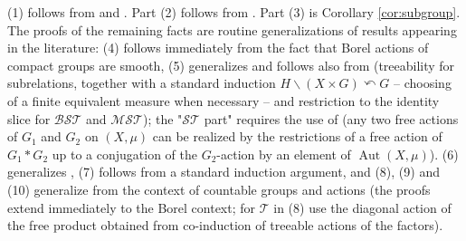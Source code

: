 \documentclass[11pt]{amsart}
\theoremstyle{definition}
\theoremstyle{plain}
\newcommand{\<}{\langle}
\renewcommand{\>}{\rangle}
\DeclareMathOperator{\Aut}{Aut}
\newcommand{\BSTreeable}{\bm{\mathscr{BST}}}
\newcommand{\MSTreeable}{\bm{\mathscr{MST}}}
\newcommand{\STreeable}{\bm{\mathscr{ST}}}
\newcommand{\Treeable}{\bm{\mathscr{T}}}
\newcommand{\pmp}{\text{p.m.p.}}
\begin{document}
\begin{appendices}
(1) follows from \cite{SS13} and \cite{JKL02}. Part (2) follows from \cite{CFW81}. Part (3) is Corollary \ref{cor:subgroup}. The proofs of the remaining facts are routine generalizations of results appearing in the literature: (4) follows immediately from the fact that Borel actions of compact groups are smooth, (5) generalizes \cite[Th. 5]
{Gab00a} and follows also from \cite[Proposition 3.3]{JKL02} (treeability for subrelations,
together with a standard induction $ H\backslash (X\times G)\curvearrowleft G$ -- choosing of a finite equivalent measure when necessary -- and restriction to the identity slice for $\BSTreeable$ and $\MSTreeable$);
 the "$\STreeable$ part" requires the use of \cite{Tor06} (any two free \pmp{} actions of $G_1$ and $G_2$ on $(X,\mu)$ can be realized by the restrictions of a free \pmp{} action of $G_1*G_2$ up to a conjugation of the $G_2$-action by an element of $\Aut(X,\mu)$).
(6) generalizes \cite[Th. VI.19 (i)]{Gab00a}, (7) follows from a standard induction argument, and (8), (9) and (10) generalize \cite[Prop. VI.10]{Gab00a} from the context of countable groups and \pmp{} actions (the proofs extend immediately to the Borel context; for $\Treeable$ in (8) use the diagonal action of the free product obtained from co-induction of treeable actions of the factors).



\end{appendices}



\end{document}
